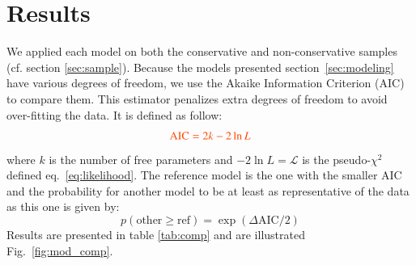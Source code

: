 \documentclass[]{aa} %
\newcommand{\nn}[1]{{\textcolor[rgb]{1, 0.27, 0}{#1}}}
\begin{document}
\section{Results}
\label{sec:results}
We applied each model on both the conservative and non-conservative samples (cf.
section \ref{sec:sample}). Because the models presented
section~\ref{sec:modeling} have various degrees of freedom, we use the Akaike
Information Criterion (AIC) \citep{burnham2004} to compare them. This estimator
penalizes extra degrees of freedom to avoid over-fitting the data. It is defined
as follow:
\begin{equation}
    \nn{\mathrm{AIC} = 2k - 2\ln L}
\end{equation}
where $k$ is the number of free parameters and \nn{$-2\ln L = \mathcal{L}$} is
the pseudo-$\chi^2$ defined eq.~\eqref{eq:likelihood}. The \nn{reference} model
is the one with the smaller AIC and the probability for another model to be at
least as representative of the data as this one is given by:
\begin{equation}
    p(\mathrm{other} \geq \mathrm{ref}) =
    \exp\left(\Delta\mathrm{AIC}/2\right)
\end{equation}
Results are presented in table \ref{tab:comp} and are illustrated
Fig.~\ref{fig:mod_comp}.
\end{document}

